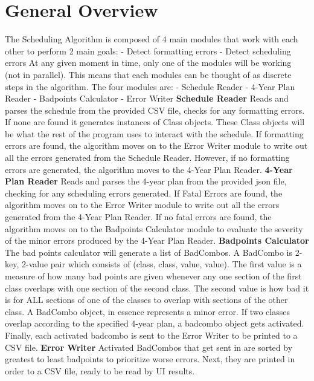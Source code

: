 \documentclass[12pt]{article}
\begin{document}
\section{General Overview}
The Scheduling Algorithm is composed of 4 main modules that work with each other to perform 2 main goals: \newline
 - Detect formatting errors \newline
 - Detect scheduling errors \newline
\newline
At any given moment in time, only one of the modules will be working (not in parallel). This means that each modules can be thought of as discrete steps in the algorithm. \newline
The four modules are: \newline
 - Schedule Reader \newline
 - 4-Year Plan Reader \newline
 - Badpoints Calculator \newline
 - Error Writer \newline
 \newline
\textbf{Schedule Reader}
\newline
Reads and parses the schedule from the provided CSV file, checks for any formatting errors. If none are found it generates instances of Class objects. These Class objects will be what the rest of the program uses to interact with the schedule. If formatting errors are found, the algorithm moves on to the Error Writer module to write out all the errors generated from the Schedule Reader. However, if no formatting errors are generated, the algorithm moves to the 4-Year Plan Reader.
\newline
\newline
\textbf{4-Year Plan Reader}
Reads and parses the 4-year plan from the provided json file, checking for any scheduling errors generated. If Fatal Errors are found, the algorithm moves on to the Error Writer module to write out all the errors generated from the 4-Year Plan Reader. If no fatal errors are found, the algorithm moves on to the Badpoints Calculator module to evaluate the severity of the minor errors produced by the 4-Year Plan Reader.
\newline
\newline
\textbf{Badpoints Calculator}
The bad points calculator will generate a list of BadCombos. A BadCombo is 2-key, 2-value pair which consists of (class, class, value, value). The first value is a measure of how many bad points are given whenever any one section of the first class overlaps with one section of the second class. The second value is how bad it is for ALL sections of one of the classes to overlap with sections of the other class. A BadCombo object, in essence represents a minor error. If two classes overlap according to the specified 4-year plan, a badcombo object gets activated. Finally, each activated badcombo is sent to the Error Writer to be printed to a CSV file.
\newline
\newline
\textbf{Error Writer}
Activated BadCombos that get sent in are sorted by greatest to least badpoints to prioritize worse errors. Next, they are printed in order to a CSV file, ready to be read by UI results.
\newpage
\end{document}
